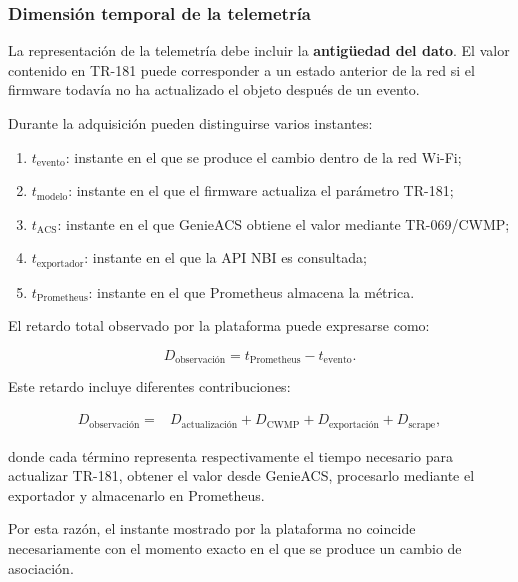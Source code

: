 \subsubsection*{Dimensión temporal de la telemetría}

La representación de la telemetría debe incluir la
\textbf{antigüedad del dato}. El valor contenido en TR-181 puede
corresponder a un estado anterior de la red si el firmware todavía no ha
actualizado el objeto después de un evento.

Durante la adquisición pueden distinguirse varios instantes:

\begin{enumerate}
    \item \(t_{\mathrm{evento}}\): instante en el que se produce el
    cambio dentro de la red Wi-Fi;

    \item \(t_{\mathrm{modelo}}\): instante en el que el firmware
    actualiza el parámetro TR-181;

    \item \(t_{\mathrm{ACS}}\): instante en el que GenieACS obtiene el
    valor mediante TR-069/CWMP;

    \item \(t_{\mathrm{exportador}}\): instante en el que la API NBI es
    consultada;

    \item \(t_{\mathrm{Prometheus}}\): instante en el que Prometheus
    almacena la métrica.
\end{enumerate}

El retardo total observado por la plataforma puede expresarse como:

\[
    D_{\mathrm{observación}}
    =
    t_{\mathrm{Prometheus}}
    -
    t_{\mathrm{evento}}.
\]

Este retardo incluye diferentes contribuciones:

\[
\begin{aligned}
    D_{\mathrm{observación}}
    ={}&
    D_{\mathrm{actualización}}
    +
    D_{\mathrm{CWMP}}
    +
    D_{\mathrm{exportación}}
    +
    D_{\mathrm{scrape}},
\end{aligned}
\]

donde cada término representa respectivamente el tiempo necesario para
actualizar TR-181, obtener el valor desde GenieACS, procesarlo mediante el
exportador y almacenarlo en Prometheus.

Por esta razón, el instante mostrado por la plataforma no coincide
necesariamente con el momento exacto en el que se produce un cambio de
asociación.

